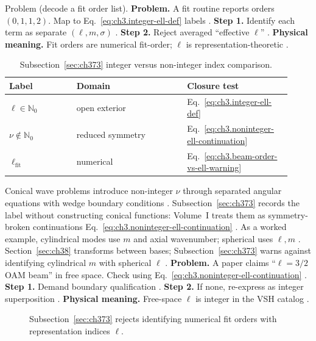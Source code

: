 Problem (decode a fit order list). \textbf{Problem.} A fit routine reports orders \((0,1,1,2)\). Map to Eq.~\eqref{eq:ch3.integer-ell-def} labels
\cite{harrington2001}.
\textbf{Step 1.} Identify each term as separate \((\ell,m,\sigma)\) \cite{hansen1988}.
\textbf{Step 2.} Reject averaged ``effective \(\ell\)'' \cite{harrington2001}.
\textbf{Physical meaning.} Fit orders are numerical fit-order; \(\ell\) is representation-theoretic \cite{stratton1941}.
\begin{table}[t]
\centering
\caption{Subsection~\ref{sec:ch373} integer versus non-integer index comparison.}
\label{tab:ch3.373-index-comparison}
\small
\begin{tabular}{@{}p{0.22\linewidth}p{0.36\linewidth}p{0.34\linewidth}@{}}
\toprule
Label & Domain & Closure test \\
\midrule
\(\ell\in\mathbb{N}_{0}\) & open exterior & Eq.~\eqref{eq:ch3.integer-ell-def} \\
\(\nu\notin\mathbb{N}_{0}\) & reduced symmetry & Eq.~\eqref{eq:ch3.noninteger-ell-continuation} \\
\(\ell_{\mathrm{fit}}\) & numerical & Eq.~\eqref{eq:ch3.beam-order-vs-ell-warning} \\
\bottomrule
\end{tabular}
\end{table}
Conical wave problems introduce non-integer \(\nu\) through separated angular equations with wedge boundary conditions
\cite{jackson1999}. Subsection~\ref{sec:ch373} records the label without constructing conical functions:
Volume~I treats them as symmetry-broken continuations Eq.~\eqref{eq:ch3.noninteger-ell-continuation}
\cite{hansen1988}.
As a worked example, cylindrical modes use \(m\) and axial wavenumber; spherical uses \(\ell,m\) \cite{stratton1941}. Section~\ref{sec:ch38}
transforms between bases; Subsection~\ref{sec:ch373} warns against identifying cylindrical \(m\) with spherical \(\ell\)
\cite{hansen1988}.
\textbf{Problem.} A paper claims ``\(\ell=3/2\) OAM beam'' in free space. Check using Eq.~\eqref{eq:ch3.noninteger-ell-continuation}
\cite{allen1992}.
\textbf{Step 1.} Demand boundary qualification \cite{stratton1941}.
\textbf{Step 2.} If none, re-express as integer superposition \cite{hansen1988}.
\textbf{Physical meaning.} Free-space \(\ell\) is integer in the VSH catalog \cite{jackson1999}.
\begin{figure}[t]
\centering
{}
\caption{Subsection~\ref{sec:ch373} rejects identifying numerical fit orders with representation indices \(\ell\).}
\label{fig:ch3.373-fit-vs-rep}
\end{figure}
